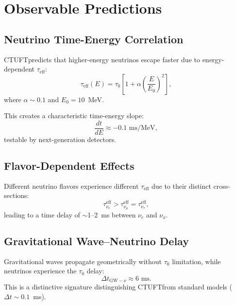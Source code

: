 \documentclass[twocolumn, tightenlines, showpacs, showkeys, nofootinbib]{revtex4-1}
\newcommand{\ctuft}{\textsc{CTUFT}}
\newcommand{\tauzero}{\tau_0}
\begin{document}
\section{Observable Predictions}
\label{sec:predictions}

\subsection{Neutrino Time-Energy Correlation}

\ctuft predicts that higher-energy neutrinos escape faster due to 
energy-dependent $\tau_{\text{eff}}$:
\begin{equation}
    \tau_{\text{eff}}(E) = \tauzero \left[1 + \alpha \left(\frac{E}{E_0}\right)^2\right],
\end{equation}
where $\alpha \sim 0.1$ and $E_0 = 10$~MeV.

This creates a characteristic time-energy slope:
\begin{equation}
    \frac{dt}{dE} \approx -0.1 \text{ ms/MeV},
\end{equation}
testable by next-generation detectors.

\subsection{Flavor-Dependent Effects}

Different neutrino flavors experience different $\tau_{\text{eff}}$ due to 
their distinct cross-sections:
\begin{equation}
    \tau_{\nu_e}^{\text{eff}} > \tau_{\nu_\mu}^{\text{eff}} = 
    \tau_{\nu_\tau}^{\text{eff}},
\end{equation}
leading to a time delay of $\sim$1--2~ms between $\nu_e$ and $\nu_x$.

\subsection{Gravitational Wave--Neutrino Delay}

Gravitational waves propagate geometrically without $\tauzero$ limitation, 
while neutrinos experience the $\tauzero$ delay:
\begin{equation}
    \Delta t_{\text{GW}-\nu} \approx 6 \text{ ms}.
\end{equation}
This is a distinctive signature distinguishing \ctuft from standard models 
($\Delta t \sim 0.1$~ms).
\end{document}
